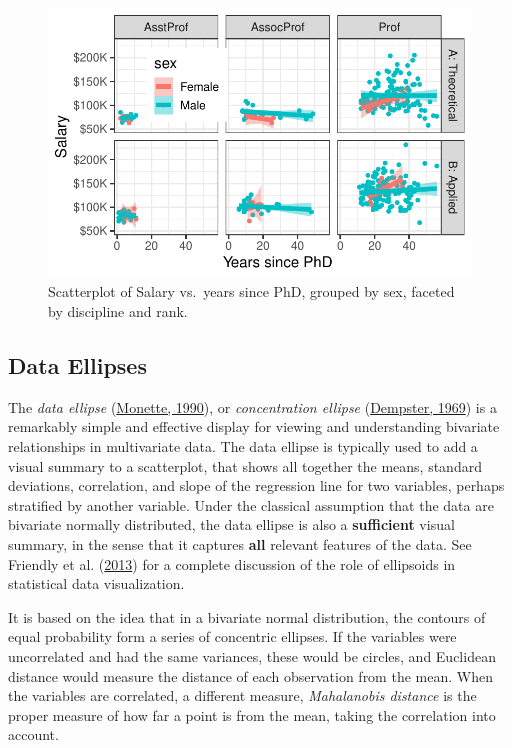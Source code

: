\documentclass[
  letterpaper,
  10pt,
  krantz2]{krantz}
\begin{document}
\begin{figure}[H]

{\centering \includegraphics[width=1\textwidth,height=\textheight]{figs/ch03/fig-Salaries-facet-sex-1.pdf}

}

\caption{\label{fig-Salaries-facet-sex}Scatterplot of Salary vs.~years
since PhD, grouped by sex, faceted by discipline and rank.}

\end{figure}

\hypertarget{sec-data-ellipse}{%
\subsection{Data Ellipses}\label{sec-data-ellipse}}

The \emph{data ellipse} (\protect\hyperlink{ref-Monette:90}{Monette,
1990}), or \emph{concentration ellipse}
(\protect\hyperlink{ref-Dempster:69}{Dempster, 1969}) is a remarkably
simple and effective display for viewing and understanding bivariate
relationships in multivariate data. The data ellipse is typically used
to add a visual summary to a scatterplot, that shows all together the
means, standard deviations, correlation, and slope of the regression
line for two variables, perhaps stratified by another variable. Under
the classical assumption that the data are bivariate normally
distributed, the data ellipse is also a \textbf{sufficient} visual
summary, in the sense that it captures \textbf{all} relevant features of
the data. See Friendly et al.
(\protect\hyperlink{ref-Friendly-etal:ellipses:2013}{2013}) for a
complete discussion of the role of ellipsoids in statistical data
visualization.

It is based on the idea that in a bivariate normal distribution, the
contours of equal probability form a series of concentric ellipses. If
the variables were uncorrelated and had the same variances, these would
be circles, and Euclidean distance would measure the distance of each
observation from the mean. When the variables are correlated, a
different measure, \emph{Mahalanobis distance} is the proper measure of
how far a point is from the mean, taking the correlation into account.
\end{document}
